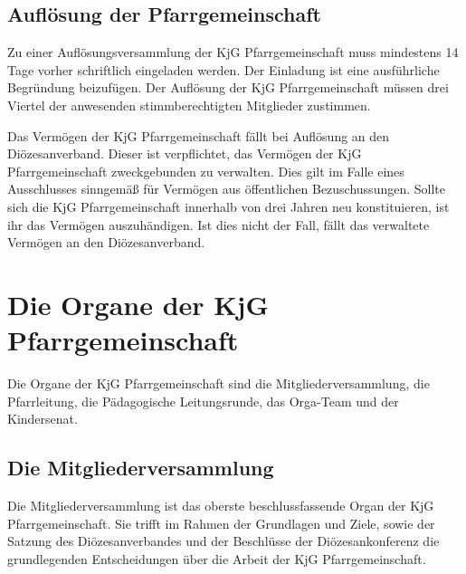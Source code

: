 \documentclass[12pt]{report}
\begin{document}
\begin{flushleft}
\subsection{Auflösung der Pfarrgemeinschaft}
Zu einer Auflösungsversammlung der KjG Pfarrgemeinschaft muss mindestens 14 Tage vorher
schriftlich eingeladen werden. Der Einladung ist eine ausführliche Begründung beizufügen. Der
Auflösung der KjG Pfarrgemeinschaft müssen drei Viertel der anwesenden stimmberechtigten
Mitglieder zustimmen.

Das Vermögen der KjG Pfarrgemeinschaft fällt bei Auflösung an den Diözesanverband.
Dieser ist verpflichtet, das Vermögen der KjG Pfarrgemeinschaft zweckgebunden zu verwalten.
Dies gilt im Falle eines Ausschlusses sinngemäß für Vermögen aus öffentlichen Bezuschussungen.
Sollte sich die KjG Pfarrgemeinschaft innerhalb von drei Jahren neu konstituieren, ist ihr das
Vermögen auszuhändigen. Ist dies nicht der Fall, fällt das verwaltete Vermögen an den Diözesanverband.

\section{Die Organe der KjG Pfarrgemeinschaft}
Die Organe der KjG Pfarrgemeinschaft sind die Mitgliederversammlung, die Pfarrleitung,
die Pädagogische Leitungsrunde, das Orga-Team und der Kindersenat.

\subsection{Die Mitgliederversammlung}
Die Mitgliederversammlung ist das oberste beschlussfassende Organ der KjG Pfarrgemeinschaft.
Sie trifft im Rahmen der Grundlagen und Ziele, sowie der Satzung des Diözesanverbandes und
der Beschlüsse der Diözesankonferenz die grundlegenden Entscheidungen über die Arbeit der
KjG Pfarrgemeinschaft.


\end{flushleft}
\end{document}
